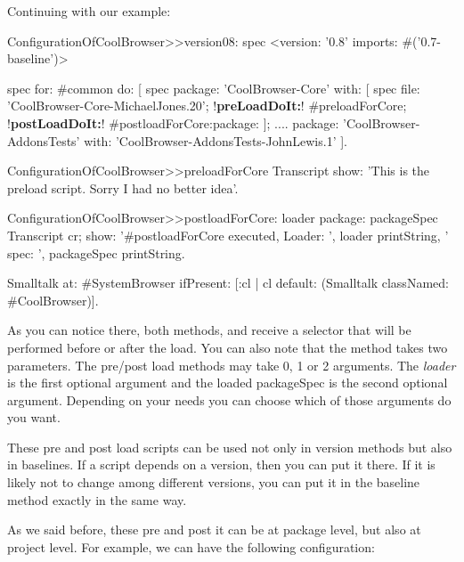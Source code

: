 \documentclass[a4paper,10pt,twoside]{book}
\begin{document}
Continuing with our example:

\begin{code}{}
ConfigurationOfCoolBrowser>>version08: spec 
       <version: '0.8' imports: #('0.7-baseline')>
       
       spec for: #common do: [
              spec 
                     package: 'CoolBrowser-Core' with: [
                            spec 
                                   file: 'CoolBrowser-Core-MichaelJones.20';
                                   !\textbf{preLoadDoIt:}! #preloadForCore;
                                   !\textbf{postLoadDoIt:}! #postloadForCore:package: ];
                     ....
                     package: 'CoolBrowser-AddonsTests' with: 'CoolBrowser-AddonsTests-JohnLewis.1' ].
\end{code}

\begin{code}{}
ConfigurationOfCoolBrowser>>preloadForCore
         Transcript show: 'This is the preload script. Sorry I had no better idea'. 
\end{code}

\begin{code}{}
ConfigurationOfCoolBrowser>>postloadForCore: loader package: packageSpec
       Transcript cr; 
              show: '#postloadForCore executed, Loader: ', loader printString, 
                     ' spec: ', packageSpec printString.
       
       Smalltalk at: #SystemBrowser ifPresent: [:cl | cl default: (Smalltalk classNamed: #CoolBrowser)].
\end{code}

As you can notice there, both methods,  and  receive a selector that will be performed before or after the load. You can also note that the method   takes two parameters. The pre/post load methods may take 0, 1 or 2 arguments. The {\em loader}  is the first optional argument and the loaded packageSpec is the second optional argument. Depending on your needs you can choose which of those arguments do you want.

These pre and post load scripts can be used not only in version methods but also in baselines. If a script depends on a version, then you can put it there. If it is likely not to change among different versions, you can put it in the baseline method exactly in the same way.

As we said before, these pre and post it can be at package level, but also at project level. For example, we can have the following configuration:
\end{document}
